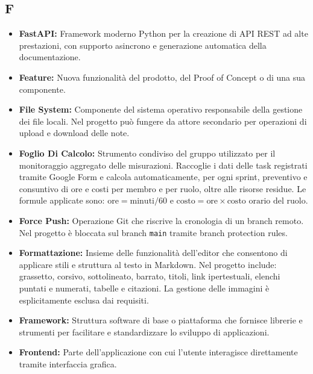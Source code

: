 \subsection*{F}
\begin{itemize}[leftmargin=*]
      \item \textbf{FastAPI:} Framework moderno Python per la creazione di API REST ad alte prestazioni, con supporto asincrono e generazione automatica della documentazione.
      \item \textbf{Feature:} Nuova funzionalità del prodotto, del Proof of Concept o di
      una sua componente.
      \item \textbf{File System:} Componente del sistema operativo responsabile della gestione dei file locali. Nel progetto può fungere da attore secondario per operazioni di upload e download delle note.
      \item \textbf{Foglio Di Calcolo:} Strumento condiviso del gruppo utilizzato per
      il monitoraggio aggregato delle misurazioni. Raccoglie i dati delle task
      registrati tramite Google Form e calcola automaticamente, per ogni sprint,
      preventivo e consuntivo di ore e costi per membro e per ruolo, oltre alle
      risorse residue. Le formule applicate sono: $\text{ore} = \text{minuti} / 60$
      e $\text{costo} = \text{ore} \times \text{costo orario del ruolo}$.
      \item \textbf{Force Push:} Operazione Git che riscrive la cronologia di un branch remoto. Nel progetto è bloccata sul branch \texttt{main} tramite branch protection rules.
      \item \textbf{Formattazione:} Insieme delle funzionalità dell'editor che
            consentono di applicare stili e struttura al testo in Markdown.
            Nel progetto include: grassetto, corsivo, sottolineato, barrato,
            titoli, link ipertestuali, elenchi puntati e numerati, tabelle e
            citazioni. La gestione delle immagini è esplicitamente esclusa dai
            requisiti.
      \item \textbf{Framework:} Struttura software di base o piattaforma che fornisce librerie e strumenti per facilitare e standardizzare lo sviluppo di applicazioni.
      \item \textbf{Frontend:} Parte dell'applicazione con cui l'utente interagisce
      direttamente tramite interfaccia grafica.
\end{itemize}
 
{}
